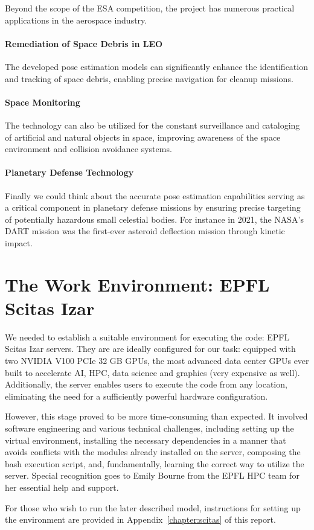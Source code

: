 Beyond the scope of the \ac{ESA} competition, the project has numerous practical applications in the aerospace industry.

\paragraph{Remediation of Space Debris in \ac{LEO}} The developed pose estimation models can significantly enhance the identification and tracking of space debris, enabling precise navigation for cleanup missions.

\paragraph{Space Monitoring} The technology can also be utilized for the constant surveillance and cataloging of artificial and natural objects in space, improving awareness of the space environment and collision avoidance systems.

\paragraph{Planetary Defense Technology} Finally we could think about the accurate pose estimation capabilities serving as a critical component in planetary defense missions by ensuring precise targeting of potentially hazardous small celestial bodies. For instance in 2021, the NASA’s \ac{DART} mission was the first-ever asteroid deflection mission through kinetic impact.

\section{The Work Environment: EPFL Scitas Izar}

We needed to establish a suitable environment for executing the code: EPFL Scitas Izar servers. They are are ideally configured for our task: equipped with two NVIDIA V100 PCIe 32 GB GPUs, the most advanced data center GPUs ever built to accelerate \ac{AI}, \ac{HPC}, data science and graphics (very expensive as well). Additionally, the server enables users to execute the code from any location, eliminating the need for a sufficiently powerful hardware configuration.

However, this stage proved to be more time-consuming than expected. It involved software engineering and various technical challenges, including setting up the virtual environment, installing the necessary dependencies in a manner that avoids conflicts with the modules already installed on the server, composing the bash execution script, and, fundamentally, learning the correct way to utilize the server. Special recognition goes to Emily Bourne from the EPFL \ac{HPC} team for her essential help and support.

For those who wish to run the later described model, instructions for setting up the environment are provided in Appendix~\ref{chapter:scitas} of this report.
